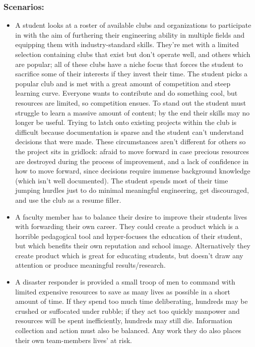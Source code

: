 \documentclass[a4paper, 10pt]{article}
\begin{document}
		\subsubsection*{Scenarios:}
		\begin{itemize}
			\item
			A student looks at a roster of available clubs and organizations to participate in with the aim of furthering their engineering ability in multiple fields and equipping them with industry-standard skills. They're met with a limited selection containing clubs that exist but don't operate well, and others which are popular; all of these clubs have a niche focus that forces the student to sacrifice some of their interests if they invest their time. The student picks a popular club and is met with a great amount of competition and steep learning curve. Everyone wants to contribute and do something cool, but resources are limited, so competition ensues. To stand out the student  must struggle to learn a massive amount of content; by the end their skills may no longer  be useful. Trying to latch onto existing projects within the club is difficult because documentation is sparse and the student can't understand decisions that were made. These circumstances aren't different for others so the project sits in gridlock: afraid to move forward in case precious resources are destroyed during the process of improvement, and a lack of confidence in how to move forward, since decisions require immense background knowledge (which isn't well documented). The student spends most of their time jumping hurdles just to do minimal meaningful engineering, get discouraged, and use the club as a resume filler.

			\item
			A faculty member has to balance their desire to improve their students lives with forwarding their own career. They could create a product which is a horrible pedagogical tool and hyper-focuses the education of their student, but which benefits their own reputation and school image. Alternatively they create product which is great for educating students, but doesn't draw any attention or produce meaningful results/research. 
			
			\item
			A disaster responder is provided a small troop of men to command with limited expensive resources to save as many lives as possible in a short amount of time. If they spend too much time deliberating, hundreds may be crushed or suffocated under rubble; if they act too quickly manpower and resources will be spent inefficiently, hundreds may still die. Information collection and action must also be balanced. Any work they do also places their own team-members lives' at risk.
		\end{itemize}
		
\end{document}
